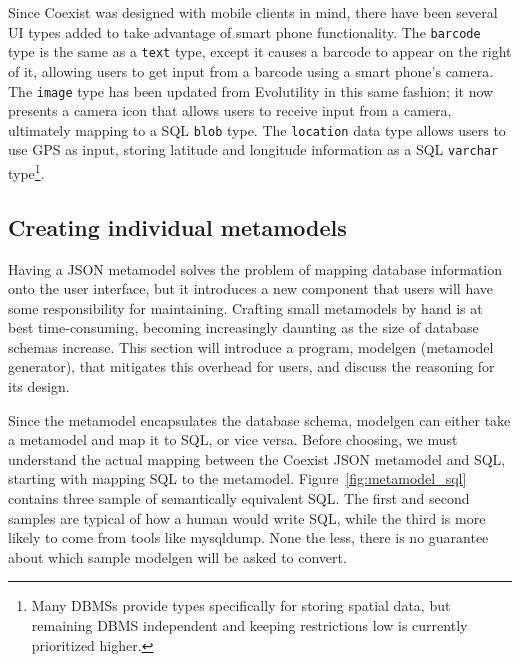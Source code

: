 Since Coexist was designed with mobile clients in mind, there have been several
UI types added to take advantage of smart phone functionality. The
\texttt{barcode} type is the same as a \texttt{text} type, except it causes a
barcode to appear on the right of it, allowing users to get input from a barcode
using a smart phone's camera. The \texttt{image} type has been updated from
Evolutility in this same fashion; it now presents a camera icon that allows
users to receive input from a camera, ultimately mapping to a SQL \texttt{blob}
type. The \texttt{location} data type allows users to use GPS as input, storing
latitude and longitude information as a SQL \texttt{varchar} type\footnote{Many
DBMSs provide types specifically for storing spatial data, but remaining DBMS
independent and keeping restrictions low is currently prioritized higher.}. 





\newcommand{\sql}[1]{\texttt{$#1_{sql}$}}
\newcommand{\mm}[1]{\texttt{$#1_{mm}$}}
\subsection{Creating individual metamodels}  \label{sec:}

Having a JSON metamodel solves the problem of mapping database information onto
the user interface, but it introduces a new component that users will have some
responsibility for maintaining. Crafting small metamodels by hand is at best
time-consuming, becoming increasingly daunting as the size of database
schemas increase.  This section will introduce a program, modelgen (metamodel
generator), that mitigates this overhead for users, and discuss the reasoning
for its design.

Since the metamodel encapsulates the database schema, modelgen can either take
a metamodel and map it to SQL, or vice versa. Before choosing, we must
understand the actual mapping between the Coexist JSON metamodel and SQL,
starting with mapping SQL to the metamodel. Figure~\ref{fig:metamodel_sql}
contains three sample of semantically equivalent SQL. The first and second
samples are typical of how a human would write SQL, while the third is more
likely to come from tools like mysqldump. None the less, there is no guarantee
about which sample modelgen will be asked to convert.

